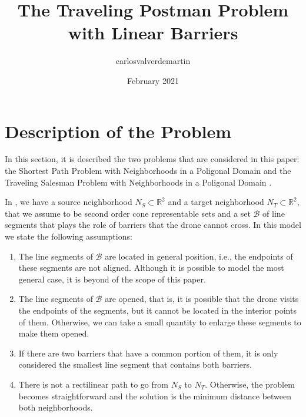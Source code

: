 \documentclass[a4paper]{elsarticle}
\title{The Traveling Postman Problem with Linear Barriers}
\author{carlosvalverdemartin }
\date{February 2021}
\newcommand{\SPP}{{\sf{SPPN-P} \xspace}}
\newcommand{\TSP}{{\sf{TSPN-P} \xspace}}
\begin{document}
\section{Description of the Problem}\label{section:description}
In this section, it is described the two problems that are considered in this paper: the Shortest Path Problem with Neighborhoods in a Poligonal Domain \SPP and the Traveling Salesman Problem with Neighborhoods in a Poligonal Domain \TSP. 

In \SPP, we have a source neighborhood $N_S\subset\mathbb R^2$ and a target neighborhood $N_T\subset\mathbb R^2$, that we assume to be second order cone representable sets and a set $\mathcal B$ of line segments that plays the role of barriers that the drone cannot cross. In this model we state the following assumptions:

\begin{enumerate}[label=\textbf{A\arabic*},ref=\textbf{A\arabic*}]
\item \label{A1}The line segments of $\mathcal B$ are located in general position, i.e., the endpoints of these segments are not aligned. Although it is possible to model the most general case, it is beyond of the scope of this paper.
\item The line segments of $\mathcal B$ are opened, that is, it is possible that the drone visits the endpoints of the segments, but it cannot be located in the interior points of them. Otherwise, we can take a small quantity to enlarge these segments to make them opened.
\item If there are two barriers that have a common portion of them, it is only considered the smallest line segment that contains both barriers.
\item \label{A4}There is not a rectilinear path to go from $N_S$ to $N_T$. Otherwise, the problem becomes straightforward and the solution is the minimum distance between both neighborhoods.
\end{enumerate}
\end{document}
